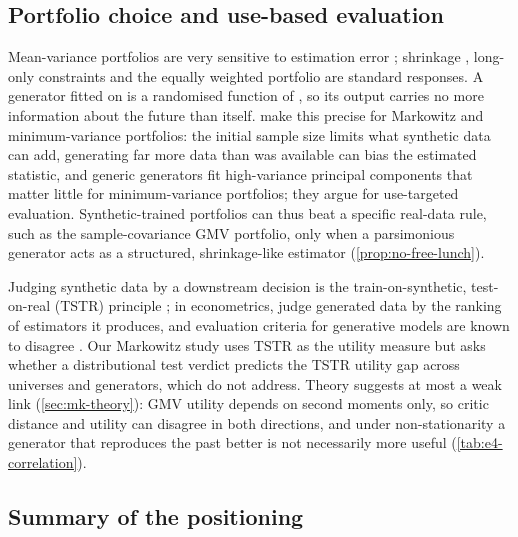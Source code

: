 \subsection{Portfolio choice and use-based evaluation}\label{sec:lit-portfolio}

Mean-variance portfolios \citep{markowitz1952portfolio} are very sensitive to estimation error
\citep{michaud1989markowitz,chopra1993effect,kan2007optimal}; shrinkage \citep{ledoit2004well},
long-only constraints \citep{jagannathan2003risk} and the equally weighted portfolio
\citep{demiguel2009optimal} are standard responses. A generator fitted on \TRAIN{} is a randomised
function of \TRAIN, so its output carries no more information about the future than \TRAIN{}
itself.  make this precise for Markowitz and minimum-variance
portfolios: the initial sample size limits what synthetic data can add, generating far more data
than was available can bias the estimated statistic, and generic generators fit high-variance
principal components that matter little for minimum-variance portfolios; they argue for
use-targeted evaluation. Synthetic-trained portfolios can thus beat a specific real-data rule, such
as the sample-covariance GMV portfolio, only when a parsimonious generator acts as a structured,
shrinkage-like estimator (\cref{prop:no-free-lunch}).

Judging synthetic data by a downstream decision is the train-on-synthetic, test-on-real (TSTR)
principle \citep{esteban2017real,yoon2019time}; in econometrics, \citet{athey2024using} judge
generated data by the ranking of estimators it produces, and evaluation criteria for generative
models are known to disagree \citep{theis2016note}. Our Markowitz study uses TSTR as the utility
measure but asks whether a distributional test verdict predicts the TSTR utility gap across
universes and generators, which \citet{cetingoz2026synthetic} do not address. Theory suggests at
most a weak link (\cref{sec:mk-theory}): GMV utility depends on second moments only, so critic
distance and utility can disagree in both directions, and under non-stationarity a generator that
reproduces the past better is not necessarily more useful (\cref{tab:e4-correlation}).

\subsection{Summary of the positioning}\label{sec:lit-summary}


